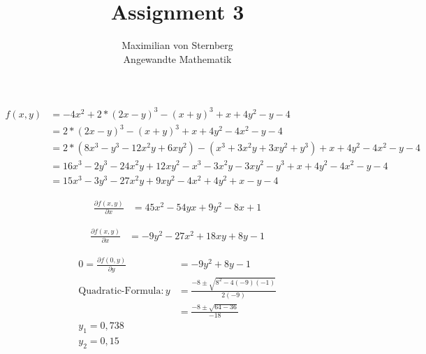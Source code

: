 \documentclass[12pt]{article}
\newenvironment{exercise}[2][Exercise]{\begin{trivlist}
\item[\hskip \labelsep {\bfseries #1}\hskip \labelsep {\bfseries #2.}]}{\end{trivlist}}
\newenvironment{question}[2][Question]{\begin{trivlist}
\item[\hskip \labelsep {\bfseries #1}\hskip \labelsep {\bfseries #2.}]}{\end{trivlist}}
\begin{document}
 
 
\title{Assignment 3}%
\author{Maximilian von Sternberg\\ %
Angewandte Mathematik} %
 
\maketitle
 
\begin{exercise}
1 
\begin{question}
a
\begin{align*}
f(x,y )& = -4x^2 + 2 * (2x - y)^3 - (x + y)^3 + x + 4y^2 - y - 4\\ 
 & = 2 * (2x - y)^3 - (x + y)^3 + x  + 4y^2 - 4x^2 - y - 4 \\	
 & = 2 * (8x^3 - y^3 -12x^2y + 6xy^2) - (x^3 + 3x^2y + 3xy^2 + y^3) + x  + 4y^2 - 4x^2 - y - 4 \\	
 & = 16x^3 - 2y^3 - 24x^2y + 12xy^2 - x^3 - 3x^2y - 3xy^2 - y^3 + x  + 4y^2 - 4x^2 - y - 4 \\	
 & = 15x^3 - 3y^3 - 27x^2y + 9xy^2 - 4x^2  + 4y^2 + x  - y - 4 
\end{align*}

\begin{align*}
\frac{\partial f(x, y)}{\partial x}& = 45x^2 - 54yx + 9y^2 - 8x  + 1 
\end{align*}

\begin{align*}
\frac{\partial f(x, y)}{\partial x}& = -9y^2 - 27x^2 + 18xy + 8y - 1
\end{align*}

\end{question}

\begin{question}
b

\begin{align*}
0 = \frac{\partial f(0, y)}{\partial y}& = -9y^2 + 8y - 1\\
\text{Quadratic-Formula}: y& =  \frac{-8\pm\sqrt{8^2-4(-9)(-1)}}{2(-9)}\\
& = \frac{-8\pm\sqrt{64-36}}{-18}\\
y_1 = 0,738 \\
y_2 = 0,15
\end{align*}


\end{question}
\end{exercise}
\end{document}

